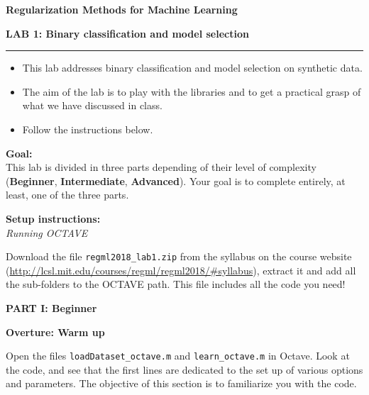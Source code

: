 \documentclass[DIN, pagenumber=false, fontsize=11pt, parskip=half]{scrartcl}
\newcommand{\mytitle}[1]{{\noindent\LARGE\textbf{#1}}}
\newcommand{\mysection}[1]{\noindent\large\textbf{#1}}
\begin{document}
\noindent\textbf{Regularization Methods for Machine Learning}

\mytitle{LAB 1: Binary classification and model selection}
\rule{\textwidth}{1pt}
\begin{itemize}\itemsep1pt \parskip0pt 
  \item This lab addresses binary classification and model selection on synthetic data.
  \item The aim of the lab is to play with the libraries and to get a practical grasp of what we have discussed in class.
  \item Follow the instructions below.

\end{itemize}

\begin{framed}
\textbf{\textbf{Goal}:} \\
This lab is divided in three parts depending of their level of complexity (\textbf{Beginner}, \textbf{Intermediate}, \textbf{Advanced}). Your goal is to complete entirely, at least, one of the three parts.
\end{framed}


\begin{framed}
\textbf{\textbf{Setup instructions}:} \\
\textit{Running OCTAVE}

 Download the file \texttt{regml2018\_lab1.zip} from the syllabus on the course website (\url{http://lcsl.mit.edu/courses/regml/regml2018/\#syllabus}), extract it and add all the sub-folders to the OCTAVE path. This file includes all the code you need!
\end{framed}

\pagebreak
\begin{center}
\large\textbf{PART I: Beginner}
\end{center}

\mysection{Overture: Warm up}

\noindent Open the files \texttt{loadDataset\_octave.m} and \texttt{learn\_octave.m} in Octave.
Look at the code, and see that the first lines are dedicated to the set up of various options and parameters.
The objective of this section is to familiarize you with the code.
\end{document}
